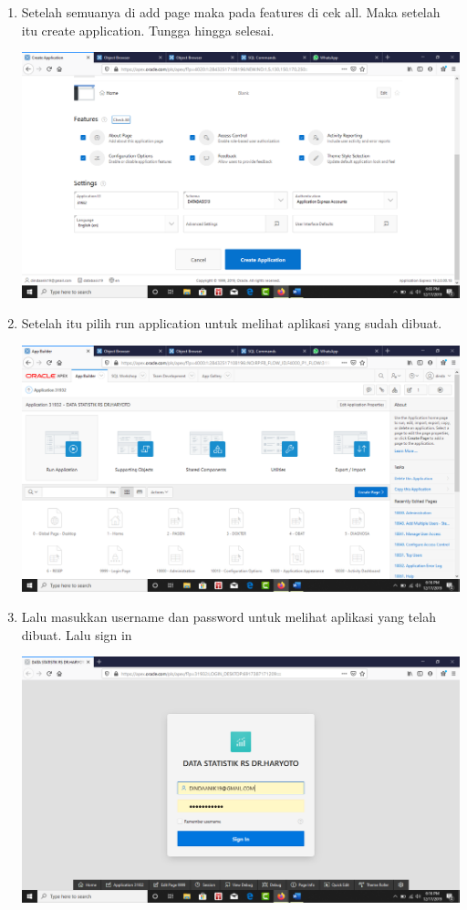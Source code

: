 \begin{enumerate}
\begin{center}
    \end{center}
    \item Setelah semuanya di add page maka pada features di cek all. Maka setelah itu create application. Tungga hingga selesai.
    \begin{center}
    \includegraphics[width=10cm\textwidth]{gambar/25.png}
    \end{center}
    \item Setelah itu pilih run application untuk melihat aplikasi yang sudah dibuat.
    \begin{center}
    \includegraphics[width=10cm\textwidth]{gambar/26.png}
    \end{center}
    \item Lalu masukkan username dan password untuk melihat aplikasi yang telah dibuat. Lalu sign in
    \begin{center}
    \includegraphics[width=10cm\textwidth]{gambar/27.png}

\end{center}
\end{enumerate}

